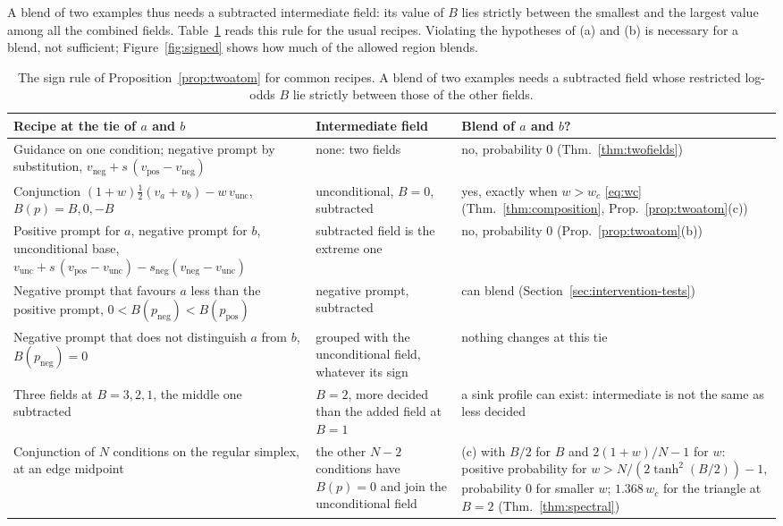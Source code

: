\documentclass{article} %
\theoremstyle{plain}
\theoremstyle{definition}
\theoremstyle{remark}
\begin{document}
A blend of two examples thus needs a subtracted intermediate field: its value of $B$ lies strictly
between the smallest and the largest value among all the combined fields. Table~\ref{tab:signrule}
reads this rule for the usual recipes. Violating the hypotheses of (a) and (b) is necessary for a
blend, not sufficient; Figure~\ref{fig:signed} shows how much of the allowed region blends.

\begin{table}[t]
\centering\small
\begin{tabular}{@{}>{\raggedright\arraybackslash}p{}>{\raggedright\arraybackslash}p{}>{\raggedright\arraybackslash}p{}@{}}
\toprule
Recipe at the tie of $a$ and $b$ & Intermediate field & Blend of $a$ and $b$?\\
\midrule
Guidance on one condition; negative prompt by substitution, $v_{\mathrm{neg}}+s\,(v_{\mathrm{pos}}-v_{\mathrm{neg}})$ & none: two fields & no, probability $0$ (Thm.~\ref{thm:twofields})\\
Conjunction $(1+w)\tfrac12(v_a+v_b)-w\,v_{\mathrm{unc}}$, $B(p)=B,0,-B$ & unconditional, $B=0$, subtracted & yes, exactly when $w>w_c$ \eqref{eq:wc} (Thm.~\ref{thm:composition}, Prop.~\ref{prop:twoatom}(c))\\
Positive prompt for $a$, negative prompt for $b$, unconditional base, $v_{\mathrm{unc}}+s\,(v_{\mathrm{pos}}-v_{\mathrm{unc}})-s_{\mathrm{neg}}(v_{\mathrm{neg}}-v_{\mathrm{unc}})$ & subtracted field is the extreme one & no, probability $0$ (Prop.~\ref{prop:twoatom}(b))\\
Negative prompt that favours $a$ less than the positive prompt, $0<B(p_{\mathrm{neg}})<B(p_{\mathrm{pos}})$ & negative prompt, subtracted & can blend (Section~\ref{sec:intervention-tests})\\
Negative prompt that does not distinguish $a$ from $b$, $B(p_{\mathrm{neg}})=0$ & grouped with the unconditional field, whatever its sign & nothing changes at this tie\\
Three fields at $B=3,2,1$, the middle one subtracted & $B=2$, more decided than the added field at $B=1$ & a sink profile can exist: intermediate is not the same as less decided\\
Conjunction of $N$ conditions on the regular simplex, at an edge midpoint & the other $N-2$ conditions have $B(p)=0$ and join the unconditional field & (c) with $B/2$ for $B$ and $2(1+w)/N-1$ for $w$: positive probability for $w>N/(2\tanh^2(B/2))-1$, probability $0$ for smaller $w$; $1.368\,w_c$ for the triangle at $B=2$ (Thm.~\ref{thm:spectral})\\
\bottomrule
\end{tabular}
\caption{The sign rule of Proposition~\ref{prop:twoatom} for common recipes. A blend of two
examples needs a subtracted field whose restricted log-odds $B$ lie strictly between those of the
other fields.}
\label{tab:signrule}
\end{table}
\end{document}
